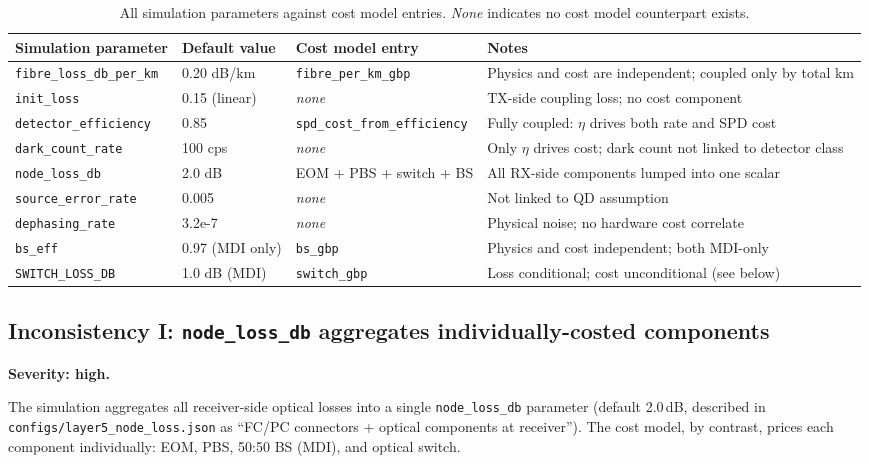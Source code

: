 \documentclass[12pt,a4paper]{article}
\begin{document}
\begin{table}[h!]
\centering
\small
\begin{tabular}{p{4.2cm}p{3.0cm}p{2.5cm}p{4.2cm}}
\toprule
Simulation parameter & Default value & Cost model entry & Notes \\
\midrule
\texttt{fibre\_loss\_db\_per\_km} & 0.20 dB/km & \texttt{fibre\_per\_km\_gbp} & Physics and cost are independent; coupled only by total km \\
\texttt{init\_loss} & 0.15 (linear) & \emph{none} & TX-side coupling loss; no cost component \\
\texttt{detector\_efficiency} & 0.85 & \texttt{spd\_cost\_from\_efficiency} & Fully coupled: $\eta$ drives both rate and SPD cost \\
\texttt{dark\_count\_rate} & 100 cps & \emph{none} & Only $\eta$ drives cost; dark count not linked to detector class \\
\texttt{node\_loss\_db} & 2.0 dB & EOM + PBS + switch + BS & All RX-side components lumped into one scalar \\
\texttt{source\_error\_rate} & 0.005 & \emph{none} & Not linked to QD assumption \\
\texttt{dephasing\_rate} & 3.2e-7 & \emph{none} & Physical noise; no hardware cost correlate \\
\texttt{bs\_eff} & 0.97 (MDI only) & \texttt{bs\_gbp} & Physics and cost independent; both MDI-only \\
\texttt{SWITCH\_LOSS\_DB} & 1.0 dB (MDI) & \texttt{switch\_gbp} & Loss conditional; cost unconditional (see below) \\
\bottomrule
\end{tabular}
\caption{All simulation parameters against cost model entries. \emph{None}
indicates no cost model counterpart exists.}
\end{table}

\subsection{Inconsistency I: \texttt{node\_loss\_db} aggregates individually-costed components}

\textbf{Severity: high.}

The simulation aggregates all receiver-side optical losses into a single
\texttt{node\_loss\_db} parameter (default 2.0\,dB, described in
\texttt{configs/layer5\_node\_loss.json} as ``FC/PC connectors + optical
components at receiver''). The cost model, by contrast, prices each component
individually: EOM, PBS, 50:50 BS (MDI), and optical switch.
\end{document}
